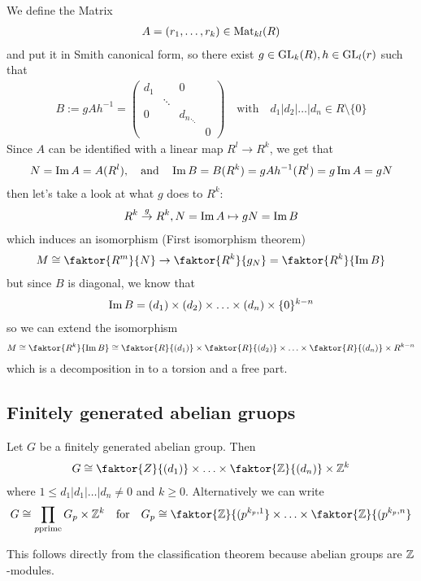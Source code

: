 We define the Matrix
\begin{align*}
	A = (r_1,\ldots,r_k) \in \operatorname{Mat}_{kl}(R)
\end{align*}
and put it in Smith canonical form, so there exist $g \in \operatorname{GL}_k(R), h \in \operatorname{GL}_l(r)$ such that
\begin{align*}
	B := gAh^{-1} = \begin{pmatrix}
	d_1 &  & 0 & \\
	 & \ddots &  & \\
	0 &  & {d_n}_{\ddots} & \\
	 &  &  & 0
	\end{pmatrix} \quad \text{with} \quad d_1|d_2|\ldots|d_n \in R \setminus \{0\}
\end{align*}
	Since $A$ can be identified with a linear map $R^{l} \to R^{k}$, we get that
	\begin{align*}
		N = \operatorname{Im} A = A(R^{l}), \quad \text{and} \quad \operatorname{Im} B = B(R^{k}) = gAh^{-1}(R^{l}) = g \operatorname{Im} A = g N
	\end{align*}
	then let's take a look at what $g$ does to $R^{k}$:
	\begin{align*}
		R^{k} \stackrel{g}{\to} R^{k}, N = \operatorname{Im} A \mapsto gN = \operatorname{Im} B
	\end{align*}
	which induces an isomorphism (First isomorphism theorem)
	\begin{align*}
		M \iso \faktor{R^{m}}{N} \to \faktor{R^{k}}{g_N} = \faktor{R^{k}}{\Image B}
	\end{align*}
	but since $B$ is diagonal, we know that
	\begin{align*}
		\operatorname{Im} B = (d_1) \times (d_2) \times \ldots \times (d_n) \times \{0\}^{k-n}
	\end{align*}
	so we can extend the isomorphism
	\begin{align*}
		M \iso \faktor{R^{k}}{\Image B} \iso \faktor{R}{(d_1)} \times \faktor{R}{(d_2)} \times \ldots \times \faktor{R}{(d_n)} \times R^{k-n}
	\end{align*}
	which is a decomposition in to a torsion and a free part.


	\subsection{Finitely generated abelian gruops}

	\begin{theorem}[]
		Let $G$ be a finitely generated abelian group. Then
		\begin{align*}
			G \iso \faktor{Z}{(d_1)} \times \ldots \times \faktor{\Z}{(d_n)} \times \Z^{k}
		\end{align*}
		where $1 \leq d_1|d_1|\ldots|d_n \neq 0$  and $k \geq 0$. Alternatively we can write
		\begin{align*}
		G \iso \prod_{p \text{prime}} G_p \times \Z^{k} \quad \text{for} \quad G_p \iso \faktor{\Z}{(p^{k_p,1}} \times \ldots \times \faktor{\Z}{(p^{k_p,n}}
		\end{align*}
	\end{theorem}
	This follows directly from the classification theorem because abelian groups are $\mathbb{Z}$-modules.

